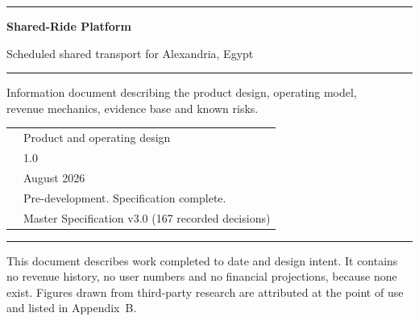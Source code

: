 \begin{titlepage}
\thispagestyle{empty}
\vspace*{28mm}
{\color{rule}\hrule height 1.2pt}
\vspace{10mm}

{\sffamily\bfseries\fontsize{27}{31}\selectfont\color{slate}
Shared-Ride Platform\par}
\vspace{5mm}
{\sffamily\fontsize{15}{19}\selectfont\color{ink}
Scheduled shared transport for Alexandria, Egypt\par}

\vspace{9mm}
{\color{rule}\hrule height 0.4pt}
\vspace{9mm}

{\large\color{muted}
Information document describing the product design, operating model,\\
revenue mechanics, evidence base and known risks.\par}

\vfill

\begin{tabular}{@{}L{42mm}L{80mm}@{}}
 & Product and operating design \\
 & 1.0 \\
 & August 2026 \\
 & Pre-development. Specification complete. \\
 & Master Specification v3.0 (167 recorded decisions) \\
\end{tabular}

\vspace{10mm}
{\color{rule}\hrule height 0.4pt}
\vspace{4mm}
{\footnotesize\color{muted}
This document describes work completed to date and design intent. It contains no revenue history,
no user numbers and no financial projections, because none exist. Figures drawn from third-party
research are attributed at the point of use and listed in Appendix~B.\par}
\end{titlepage}

\setcounter{page}{2}
\tableofcontents
{}
\cleardoublepage
{}
\setcounter{page}{1}

